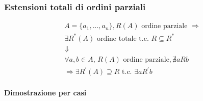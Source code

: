 \documentclass{report}
\newcommand{\subsubsubsection}[1]{\paragraph{#1}\mbox{}\\}
\begin{document}
        \subsubsection{Estensioni totali di ordini parziali}
            $$\begin{array}{c}
                A = \{a_1, ..., a_n\}, R\left(A\right) \textrm{ ordine parziale } \Longrightarrow \\ 
                \exists R^{*}\left(A\right) \textrm{ ordine totale t.c. } R \subseteq R^* \\
                \Downarrow \\
                \forall a,b \in A, \, R\left(A\right) \textrm{ ordine parziale}, \nexists aRb \\
                \Longrightarrow \exists R^{'}\left(A\right) \supseteq R \textrm{ t.c. } \exists aR^{'}b 
            \end{array}$$ 
            \subsubsubsection{Dimostrazione per casi}
\end{document}
